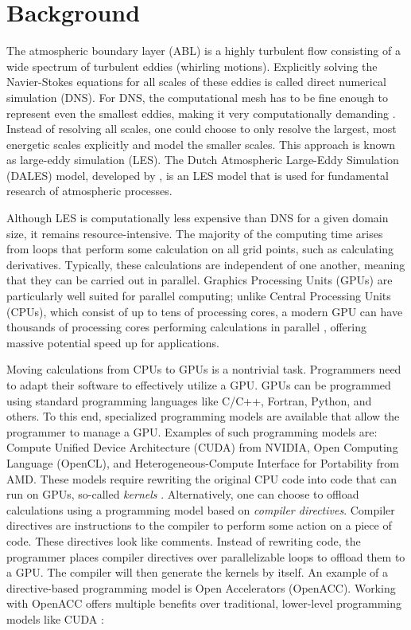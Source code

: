 \section{Background}
The atmospheric boundary layer (ABL) is a highly turbulent flow consisting of a wide spectrum of turbulent eddies (whirling motions). Explicitly solving the Navier-Stokes equations for all scales of these eddies is called direct numerical simulation (DNS). For DNS, the computational mesh has to be fine enough to represent even the smallest eddies, making it very computationally demanding \citep{moengNUMERICALMODELSLargeEddy2015}. Instead of resolving all scales, one could choose to only resolve the largest, most energetic scales explicitly and model the smaller scales. This approach is known as large-eddy simulation (LES). The Dutch Atmospheric Large-Eddy Simulation (DALES) model, developed by \citet{heusFormulationDutchAtmospheric2010}, is an LES model that is used for fundamental research of atmospheric processes.

Although LES is computationally less expensive than DNS for a given domain size, it remains resource-intensive. The majority of the computing time arises from loops that perform some calculation on all grid points, such as calculating derivatives. Typically, these calculations are independent of one another, meaning that they can be carried out in parallel. Graphics Processing Units (GPUs) are particularly well suited for parallel computing; unlike Central Processing Units (CPUs), which consist of up to tens of processing cores, a modern GPU can have thousands of processing cores performing calculations in parallel \citep{elsterNvidiaHopperGPU2022}, offering massive potential speed up for applications.

Moving calculations from CPUs to GPUs is a nontrivial task. Programmers need to adapt their software to effectively utilize a GPU. GPUs can be programmed using standard programming languages like C/C++, Fortran, Python, and others. To this end, specialized programming models are available that allow the programmer to manage a GPU. Examples of such programming models are: Compute Unified Device Architecture (CUDA) from NVIDIA, Open Computing Language (OpenCL), and Heterogeneous-Compute Interface for Portability from AMD. These models require rewriting the original CPU code into code that can run on GPUs, so-called \emph{kernels} \citep{owensGPUComputing2008}. 
Alternatively, one can choose to offload calculations using a programming model based on \emph{compiler directives}. Compiler directives are instructions to the compiler to perform some action on a piece of code. These directives look like comments. Instead of rewriting code, the programmer places compiler directives over parallelizable loops to offload them to a GPU. The compiler will then generate the kernels by itself. An example of a directive-based programming model is Open Accelerators (OpenACC). Working with OpenACC offers multiple benefits over traditional, lower-level programming models like CUDA \citep{herdmanAcceleratingHydrocodesOpenACC2012}:

